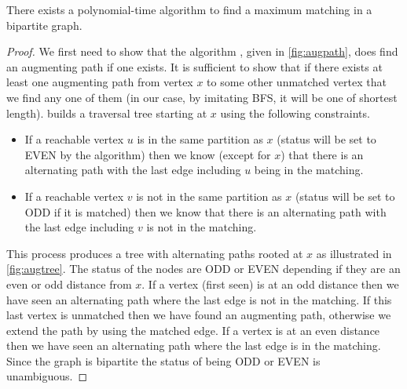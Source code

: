 \begin{Theorem}
There exists a polynomial-time algorithm to find a maximum matching
in a bipartite graph.
\end{Theorem}
\begin{proof}
We first need to show that the algorithm , given in
\cref{fig:augpath}, does find an augmenting path if one exists.
It is sufficient to show that if there exists at least one augmenting path 
from vertex $x$ to some other unmatched vertex that we find any one of them 
(in our case, by imitating BFS, it will be one of shortest length).  
builds a traversal tree starting at $x$ using the following constraints.
\begin{itemize}
\item If a reachable vertex $u$ is in the same partition as $x$ (status will
be set to EVEN by the algorithm) then we know (except for $x$) that there is 
an alternating path with the last edge including $u$ being in the matching.
\item If a reachable vertex $v$ is not in the same partition as $x$ (status will
be set to ODD if it is matched) then we know that there is 
an alternating path with the last edge including $v$ is not in the matching.
\end{itemize}
This process produces a tree with alternating paths rooted at $x$ as 
illustrated in \cref{fig:augtree}.  The status of the nodes are ODD 
or EVEN depending if they are an even or odd distance from $x$.  If a vertex 
(first seen) is at an odd distance then we have seen an alternating path 
where the last edge is not in the matching.  If this last vertex is unmatched 
then we have found an augmenting path, otherwise we extend the path by using 
the matched edge.  
If a vertex is at an even distance then we have seen an alternating path
where the last edge is in the matching.  Since the graph is bipartite the
status of being ODD or EVEN is unambiguous.


\end{proof}
